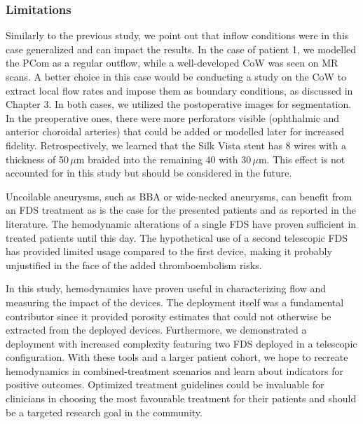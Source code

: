 \subsubsection*{Limitations}
Similarly to the previous study, we point out that inflow conditions were in this case generalized and can impact the results. In the case of patient 1, we modelled the PCom as a regular outflow, while a well-developed CoW was seen on MR scans. A better choice in this case would be conducting a study on the CoW to extract local flow rates and impose them as boundary conditions, as discussed in Chapter 3. In both cases, we utilized the postoperative images for segmentation. In the preoperative ones, there were more perforators visible (ophthalmic and anterior choroidal arteries) that could be added or modelled later for increased fidelity. Retrospectively, we learned that the Silk Vista stent has 8 wires with a thickness of 50\,$\mu$m braided into the remaining 40 with 30\,$\mu$m. This effect is not accounted for in this study but should be considered in the future.\\

\vspace*{1cm}

\begin{tcolorbox}[conclusions]

	Uncoilable aneurysms, such as BBA or wide-necked aneurysms, can benefit from an FDS treatment as is the case for the presented patients and as reported in the literature. The hemodynamic alterations of a single FDS have proven sufficient in treated patients until this day. The hypothetical use of a second telescopic FDS has provided limited usage compared to the first device, making it probably unjustified in the face of the added thromboembolism risks.

	In this study, hemodynamics have proven useful in characterizing flow and measuring the impact of the devices. The deployment itself was a fundamental contributor since it provided porosity estimates that could not otherwise be extracted from the deployed devices. Furthermore, we demonstrated a deployment with increased complexity featuring two FDS deployed in a telescopic configuration. With these tools and a larger patient cohort, we hope to recreate hemodynamics in combined-treatment scenarios and learn about indicators for positive outcomes. Optimized treatment guidelines could be invaluable for clinicians in choosing the most favourable treatment for their patients and should be a targeted research goal in the community.

\end{tcolorbox}

\newpage

{\footnotesize
	}